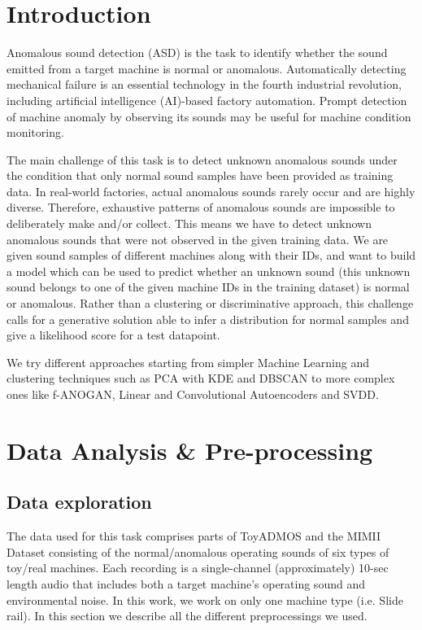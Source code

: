 \documentclass{article}
\begin{document}
	
	
\section{Introduction}


    Anomalous sound detection (ASD) is the task to identify whether the sound emitted from a target machine is normal or anomalous. Automatically detecting mechanical failure is an essential technology in the fourth industrial revolution, including artificial intelligence (AI)-based factory automation. Prompt detection of machine anomaly by observing its sounds may be useful for machine condition monitoring.

    The main challenge of this task is to detect unknown anomalous sounds under the condition that only normal sound samples have been provided as training data. In real-world factories, actual anomalous sounds rarely occur and are highly diverse. Therefore, exhaustive patterns of anomalous sounds are impossible to deliberately make and/or collect. This means we have to detect unknown anomalous sounds that were not observed in the given training data. We are given sound samples of different machines along with their IDs, and want to build a model which can be used to predict whether an unknown sound (this unknown sound belongs to one of the given machine IDs in the training dataset) is normal or anomalous. Rather than a clustering or discriminative approach, this challenge calls for a generative solution able to infer a distribution for normal samples and give a likelihood score for a test datapoint.
    
    We try different approaches starting from simpler Machine Learning and clustering techniques such as PCA with KDE and DBSCAN to more complex ones like f-ANOGAN, Linear and Convolutional Autoencoders and SVDD.


\section{Data Analysis \& Pre-processing}
    \subsection{Data exploration}
    The data used for this task comprises parts of ToyADMOS and the MIMII Dataset consisting of the normal/anomalous operating sounds of six types of toy/real machines. Each recording is a single-channel (approximately) 10-sec length audio that includes both a target machine's operating sound and environmental noise. In this work, we work on only one machine type (i.e. Slide rail). 
    In this section we describe all the different preprocessings we used.
    
\end{document}

